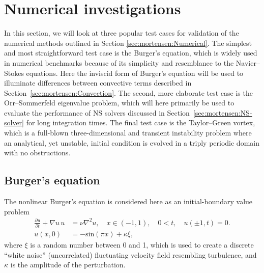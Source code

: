 \section{Numerical investigations}
\label{sec:mortensen:testcases}

In this section, we will look at three popular test cases for
validation of the numerical methods outlined in Section
\ref{sec:mortensen:Numerical}. The simplest and most straightforward
test case is the Burger's equation, which is widely used in numerical
benchmarks because of its simplicity and resemblance to the
Navier--Stokes equations. Here the inviscid form of Burger's equation
will be used to illuminate differences between convective terms
described in Section~\ref{sec:mortensen:Convection}. The second, more
elaborate test case is the Orr--Sommerfeld eigenvalue problem, which
will here primarily be used to evaluate the performance of NS solvers
discussed in Section~\ref{sec:mortensen:NS-solver} for long
integration times. The final test case is the Taylor--Green vortex,
which is a full-blown three-dimensional and transient instability
problem where an analytical, yet unstable, initial condition is
evolved in a triply periodic domain with no obstructions.

\subsection{Burger's equation}
\label{sec:mortensen:burgers}

The nonlinear Burger's equation is considered here as an
initial-boundary value problem
\begin{align}
 \frac{\partial u}{\partial t}+\nabla u \, u &= \nu \nabla^2 u, \quad x \in (-1,1), \quad 0<t, \quad u(\pm 1,t)=0. \\
 u(x,0) &=-\text{sin}(\pi x)+\kappa \xi,
\label{eq:mortensen:burgers}
\end{align}
where $\xi$ is a random number between 0 and 1, which is used to
create a discrete ``white noise'' (uncorrelated) fluctuating velocity
field resembling turbulence, and $\kappa$ is the amplitude of the
perturbation.

